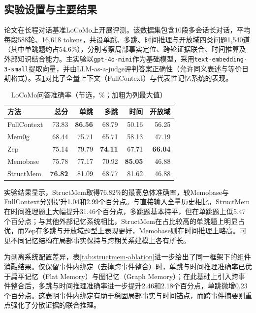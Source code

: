 \subsection{实验设置与主要结果}

论文在长程对话基准LoCoMo上开展评测。该数据集包含10段多会话长对话，平均每段588轮、16,618 tokens，共设单跳、多跳、时间推理与开放域四类问题1,540道（其中单跳题约占54.6\%），分别考察局部事实定位、跨轮证据联合、时间推算及外部知识结合能力。主实验以\texttt{gpt-4o-mini}作为基础模型，采用\texttt{text-embedding-3-small}提取向量，并由LLM-as-a-judge评判答案正确性（允许同义表述与等价日期格式）。表\ref{tab:structmem-accuracy}对比了全量上下文（FullContext）与代表性记忆系统的表现。

\begin{table}[!htbp]
\centering\small
\caption{LoCoMo问答准确率（节选，\%；加粗为列最大值）}
\label{tab:structmem-accuracy}
\begin{tabular}{@{}lrrrrr@{}}
\toprule
方法 & 总分 & 单跳 & 多跳 & 时间 & 开放域\\
\midrule
FullContext & 73.83 & \textbf{86.56} & 68.79 & 50.16 & 56.25\\
Mem0g & 68.44 & 75.71 & 65.71 & 58.13 & 47.19\\
Zep & 75.14 & 79.79 & \textbf{74.11} & 67.71 & \textbf{66.04}\\
Memobase & 75.78 & 77.17 & 70.92 & \textbf{85.05} & 46.88\\
StructMem & \textbf{76.82} & 81.09 & 68.77 & 81.62 & 46.88\\
\bottomrule
\end{tabular}
\end{table}

实验结果显示，StructMem取得76.82\%的最高总体准确率，较Memobase与FullContext分别提升1.04和2.99个百分点。与直接输入全量历史相比，StructMem在时间推理题上大幅提升31.46个百分点，多跳题基本持平，但在单跳题上低5.47个百分点；与其他外部记忆系统相比，StructMem在占比较高的单跳题上明显占优，而Zep在多跳与开放域题型上表现更好，Memobase则在时间推理上略高。可见不同记忆结构在局部事实保持与跨期关系建模上各有所长。

为剥离系统配置差异，表\ref{tab:structmem-ablation}进一步给出了同一框架下的组件消融结果。仅保留事件内绑定（去掉跨事件整合）时，单跳与时间推理准确率已优于扁平记忆（Flat Memory）与图记忆（Graph Memory）；在此基础上引入跨事件整合后，多跳与时间推理准确率进一步提升2.46和2.18个百分点，单跳微增0.23个百分点。这表明事件内绑定有助于稳固局部事实与时间锚点，而跨事件摘要则重点强化了分散证据的联合推理。

